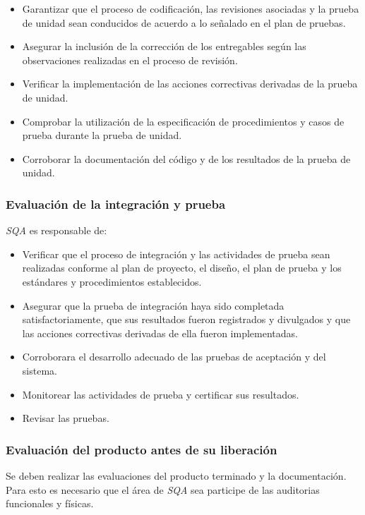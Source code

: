 	\begin{itemize}
		\item 
		Garantizar que el proceso de codificación, las revisiones asociadas y la prueba de unidad sean conducidos de acuerdo a lo señalado en el plan de pruebas.
		\item
		Asegurar la inclusión de la corrección de los entregables según las observaciones realizadas en el proceso de revisión.
		\item
		Verificar la implementación de las acciones correctivas derivadas de la prueba de unidad.
		\item
		Comprobar la utilización de la especificación de procedimientos y casos de prueba durante la prueba de unidad. 
		\item
		Corroborar la documentación del código y de los resultados de la prueba de unidad.
	\end{itemize}

\subsubsection{Evaluación de la integración y prueba}

\textit{SQA} es responsable de:

	\begin{itemize}
		\item 
		Verificar que el proceso de integración y las actividades de prueba sean realizadas conforme al plan de proyecto, el diseño, el plan de prueba y los estándares y procedimientos establecidos.
		\item
		Asegurar que la prueba de integración haya sido completada satisfactoriamente, que sus resultados fueron registrados y divulgados y que las acciones correctivas derivadas de ella fueron implementadas.
		\item	
		Corroborara el desarrollo adecuado de las pruebas de aceptación y del sistema.
		\item
		Monitorear las actividades de prueba y certificar sus resultados.
		\item
		Revisar las pruebas.
	\end{itemize}

\subsubsection{Evaluación del producto antes de su liberación}

Se deben realizar las evaluaciones del producto terminado y la documentación. Para esto es necesario que el área de \textit{SQA} sea participe de las auditorias funcionales y físicas. 

